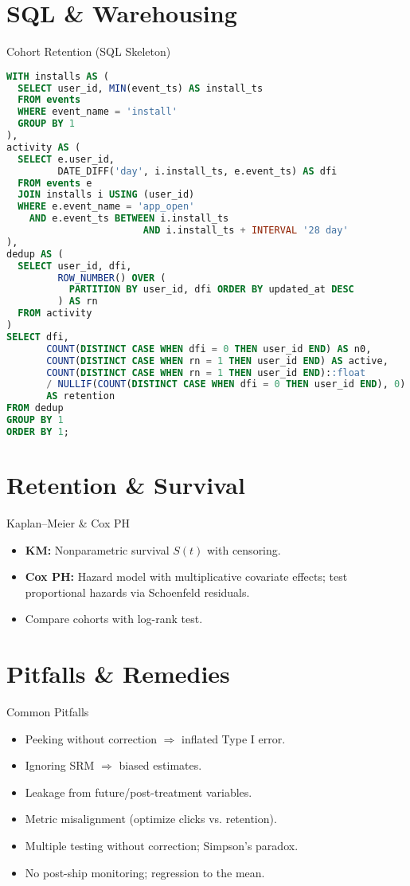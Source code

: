 \documentclass[aspectratio=169]{beamer}
\begin{document}
\section{SQL \& Warehousing}
\begin{frame}[fragile]{Cohort Retention (SQL Skeleton)}
\begin{lstlisting}[language=SQL,basicstyle=\ttfamily\tiny]
WITH installs AS (
  SELECT user_id, MIN(event_ts) AS install_ts
  FROM events
  WHERE event_name = 'install'
  GROUP BY 1
),
activity AS (
  SELECT e.user_id,
         DATE_DIFF('day', i.install_ts, e.event_ts) AS dfi
  FROM events e
  JOIN installs i USING (user_id)
  WHERE e.event_name = 'app_open'
    AND e.event_ts BETWEEN i.install_ts
                        AND i.install_ts + INTERVAL '28 day'
),
dedup AS (
  SELECT user_id, dfi,
         ROW_NUMBER() OVER (
           PARTITION BY user_id, dfi ORDER BY updated_at DESC
         ) AS rn
  FROM activity
)
SELECT dfi,
       COUNT(DISTINCT CASE WHEN dfi = 0 THEN user_id END) AS n0,
       COUNT(DISTINCT CASE WHEN rn = 1 THEN user_id END) AS active,
       COUNT(DISTINCT CASE WHEN rn = 1 THEN user_id END)::float
       / NULLIF(COUNT(DISTINCT CASE WHEN dfi = 0 THEN user_id END), 0)
       AS retention
FROM dedup
GROUP BY 1
ORDER BY 1;
\end{lstlisting}
\end{frame}

\section{Retention \& Survival}
\begin{frame}{Kaplan--Meier \& Cox PH}
  \begin{itemize}
    \item \textbf{KM:} Nonparametric survival $S(t)$ with censoring.
    \item \textbf{Cox PH:} Hazard model with multiplicative covariate effects; test proportional hazards via Schoenfeld residuals.
    \item Compare cohorts with log-rank test.
  \end{itemize}
\end{frame}

\section{Pitfalls \& Remedies}
\begin{frame}{Common Pitfalls}
  \begin{itemize}
    \item Peeking without correction $\Rightarrow$ inflated Type I error.
    \item Ignoring SRM $\Rightarrow$ biased estimates.
    \item Leakage from future/post-treatment variables.
    \item Metric misalignment (optimize clicks vs. retention).
    \item Multiple testing without correction; Simpson's paradox.
    \item No post-ship monitoring; regression to the mean.
  \end{itemize}
\end{frame}
\end{document}
